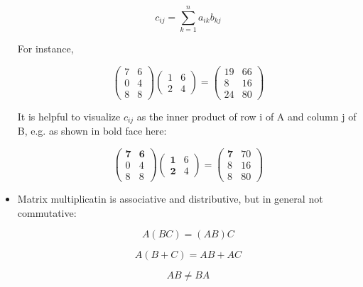 \begin{itemize}
\begin{equation}
c_{ij} = \sum_{k=1}^n a_{ik} b_{kj}
\end{equation}

For instance,

\begin{equation}
\left (
\begin{array}{cc}
7 & 6 \\
0 & 4 \\
8 & 8 
\end{array}
\right )
\left (
\begin{array}{cc}
1 & 6 \\
2 & 4 
\end{array}
\right ) =
\left (
\begin{array}{cc}
19 & 66 \\
8 & 16 \\
24 & 80
\end{array}
\right ) 
\end{equation}

It is helpful to visualize $c_{ij}$ as the inner product of row i of A
and column j of B, e.g. as shown in bold face here:

\begin{equation}
\left (
\begin{array}{cc}
\mathbf 7 & \mathbf 6 \\
0 & 4 \\
8 & 8 
\end{array}
\right )
\left (
\begin{array}{cc}
\mathbf 1 & 6 \\
\mathbf 2 & 4 
\end{array}
\right ) =
\left (
\begin{array}{cc}
\mathbf 7 & 70 \\
8 & 16 \\
8 & 80
\end{array}
\right ) 
\end{equation}

\item Matrix multiplicatin is associative and distributive, but in
general not commutative:

\begin{equation}
A(BC) = (AB)C
\end{equation}

\begin{equation}
A(B+C) = AB + AC
\end{equation}

\begin{equation}
AB \neq BA
\end{equation}

\end{itemize}

